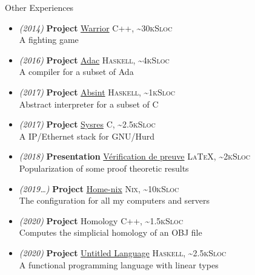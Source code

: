 \documentclass[a4paper,11pt]{extarticle}
\newcommand{\cvtitle}[1]{
    \begin{tcolorbox}[colback=sidebg,colframe=sidefg,coltext=sidetext,
        height=1cm, valign=center, sharp corners=downhill]
        {\Large #1}
    \end{tcolorbox}
}
\newcommand{\lang}[2]{\hfill \textsc{\scriptsize #1, \textasciitilde#2Sloc}}
\begin{document}
\begin{minipage}[c][282mm][t]{0.60\linewidth}
{        \cvtitle{Other Experiences}

        \begin{itemize}
          \itemsep0em
          \item \emph{\small (2014)} \textbf{Project} \href{https://github.com/DWARVES/Project-Warrior}{Warrior}
                \lang{C++}{30k}\\
                A fighting game
          \item \emph{\small (2016)} \textbf{Project} \href{https://github.com/TWal/ENS\_Adac}{Adac}
                \lang{Haskell}{4k}\\
                A compiler for a subset of Ada
          \item \emph{\small (2017)} \textbf{Project} \href{https://github.com/dwarfmaster/absint}{Absint}
                \lang{Haskell}{1k}\\
                Abstract interpreter for a subset of C
          \item \emph{\small (2017)} \textbf{Project} \href{https://github.com/dwarfmaster/ENS_sysres}{Sysres}
                \lang{C}{2.5k}\\
                A IP/Ethernet stack for GNU/Hurd
          \item \emph{\small (2018)} \textbf{Presentation} \href{https://sapt.fr/exposes/verification-automatique-de-preuves-884}{Vérification de preuve}
                \lang{\LaTeX}{2k}\\
                Popularization of some proof theoretic results
          \item \emph{\small (2019\dots)} \textbf{Project} \href{https://github.com/dwarfmaster/home-nix}{Home-nix}
                \lang{Nix}{10k}\\
                The configuration for all my computers and servers
          \item \emph{\small (2020)} \textbf{Project} Homology
                \lang{C++}{1.5k}\\
                Computes the simplicial homology of an OBJ file
          \item \emph{\small (2020)} \textbf{Project} \href{https://github.com/math-fehr/Untitled-Language}{Untitled Language}
                \lang{Haskell}{2.5k}\\
                A functional programming language with linear types
        \end{itemize}

      }
    \end{minipage}
\end{document}
